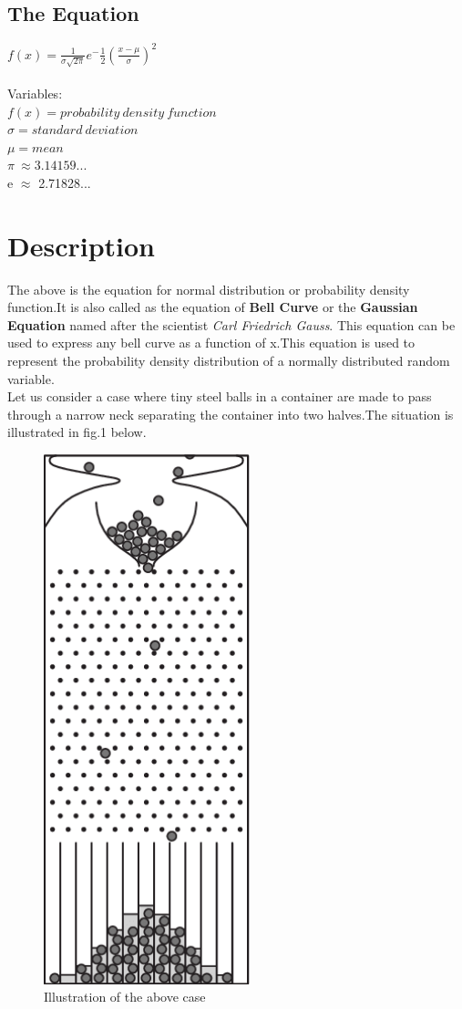 

\subsection{The Equation}

 {\huge $f(x)= \frac{1}{\sigma \sqrt{2\pi}} e^-\frac{1}{2}(\frac{x-\mu}{\sigma})^2$}
 \\
\\Variables:
\\$f(x) = probability \ density \ function$
 \\ $\sigma = standard \ deviation $
 \\$ \mu = mean$
 \\ $\pi \ \approx 3.14159... $
 \\ e $\approx$ 2.71828...
 \section{Description}
 The above is the equation for normal distribution or probability density function.It is also called as the equation of \textbf {Bell Curve} or the \textbf{Gaussian Equation} named after the scientist {\emph{Carl Friedrich Gauss}}. This equation can be used to express any bell curve as a function of x.This equation is used to represent the probability density distribution of a normally distributed random variable.
 \\Let us consider a case where tiny steel balls in a container are made to pass through a narrow neck separating the container into two halves.The situation is illustrated in fig.1 below. \\
 
 \begin{figure}[htbp]
    \centerline{\includegraphics[width=6cm]{curve.png}}
    \caption{Illustration of the above case}
    \label{fig:mesh1}
\end{figure}

